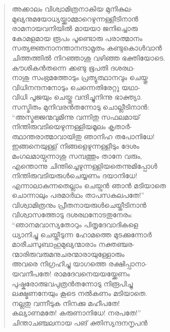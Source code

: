 \begin{verse}
അക്കാലം വിശ്വാമിത്രനാകിയ മുനികുല-\\
മുഖ്യനുമയോധ്യയ്ക്കാമ്മാറെഴുന്നള്ളീടിനാന്‍\\
രാമനായവനിയില്‍ മായയാ ജനിച്ചൊരു\\
കോമളമായ രൂപം പൂണ്ടൊരു പരാത്മാനം\\
സത്യജ്ഞനാനന്താനന്ദാമൃതം കണ്ടുകൊള്‍വാന്‍\\
ചിത്തത്തില്‍ നിറഞ്ഞാശു വഴിഞ്ഞ ഭക്തിയോടെ.\\
കൗശികന്‍തന്നെ ക്കണ്ടു ഭൂപതി ദശരഥ-\\
നാശു സംഭ്രമത്തോടും പ്രത്യുത്ഥാനവും ചെയ്തു\\
വിധിനന്ദനനോടും ചെന്നെതിരേറ്റു യഥാ-\\
വിധി പൂജയും ചെയ്തു വന്ദിച്ചുനിന്നു ഭാക്ത്യാ.\\
സസ്മിതം മുനിവരന്‍തന്നോടു ചൊല്ലീടിനാന്‍:\\
“അസ്മജ്ജന്മവുമിന്നു വന്നിതു സഫലമായ്\\
നിന്തിരുവടിയെഴുന്നള്ളിയമൂലം കൃതാര്‍-\\
ത്ഥാന്തരാത്മാവായിതു ഞാനിഹ തപോനിധേ!\\
ഇങ്ങനെയുള്ള് നിങ്ങളെഴുന്നള്ളീടും ദേശം\\
മംഗലമായ്വന്നാശു സമ്പത്തും താനേ വരും,\\
എന്തൊന്നു ചിന്തിച്ചെഴുന്നള്ളിയതെന്നുമിപ്പോള്‍\\
നിന്തിരുവടിയരുള്‍ചെയ്യണം ദയാനിധേ!\\
എന്നാലാകുന്നതെല്ലാം ചെയ്വന്‍ ഞാന്‍ മടിയാതെ\\
ചൊന്നാലും പരമാര്‍ഥം താപസകുലപതേ!”\\
വിശ്വാമിത്രനും പ്രീതനായരുള്‍ചെയ്തീടിനാന്‍\\
വിശ്വാസത്തോടു ദശരഥനോടതുനേരം:\\
“ഞാനമവാസ്യതോറും പിതൃദേവാദികളെ\\
ധ്യാനിച്ചു ചെയ്തീടുന്ന ഹോമത്തെ മുടക്കുന്നോര്‍\\
മാരീചസുബാഹുമുഖ്യന്മാരാം നക്തഞ്ചര-\\
ന്മാരിരുവരുമനുചരന്മാരായുള്ളോരും\\
അവരെ നിഗ്രഹിച്ചു യാഗത്തെ രക്ഷിപ്പാനാ-\\
യവനീപതേ! രാമദേവനെയയയ്ക്കേണം\\
പുഷ്കരോത്ഭവപുത്രന്‍തന്നോടു നിരൂപിച്ചു\\
ലക്ഷ്മണനേയും കൂടെ നല്‍കണം മടിയാതെ.\\
നല്ലതു വന്നീടുക നിനക്കു മഹീപതേ!\\
കല്യാണമതേ! കരുണാനിധേ! നരപതേ!”\\
ചിന്താചഞ്ചലനായ പങ് ക്തിസ്യന്ദനനൃപന്‍\\

\end{verse}
